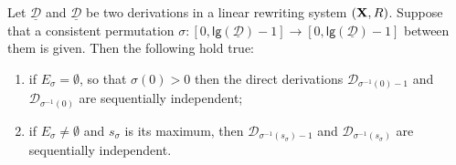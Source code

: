 \documentclass[a4paper,UKenglish,cleveref,pdftex,thm-restate,numberwithinsect]{lipics-v2021}
\def\R{\mathsf{R}}
\def\X{\textbf {\textup{X}}}
\newcommand{\dder}[1]{\mathscr{#1}}
\newcommand{\der}[1]{\underline{\dder{#1}}}
\newcommand{\lgh}[0]{\mathsf{lg}}
\begin{document}
\begin{lemma}
	Let $\der{D}$ and $\der{D}$ be two derivations in a linear rewriting system $(\X, \R)$. Suppose that a consistent permutation $\sigma:[0, \lgh(\der{D})-1]\to [0, \lgh(\der{D})-1]$ between them is given. Then the following hold true:
	\begin{enumerate}
		\item if $E_{\sigma} = \emptyset$, so that $\sigma(0)>0$ then the direct derivations $\dder{D}_{\sigma^{-1}(0)-1}$ and $\dder{D}_{\sigma^{-1}(0)}$ are sequentially independent;
		\item if $E_{\sigma}\neq \emptyset$ and $s_\sigma$ is its maximum, then $\dder{D}_{\sigma^{-1}(s_\sigma)-1}$ and $\dder{D}_{\sigma^{-1}(s_\sigma)}$ are sequentially independent.
	\end{enumerate}
\end{lemma}
\end{document}
